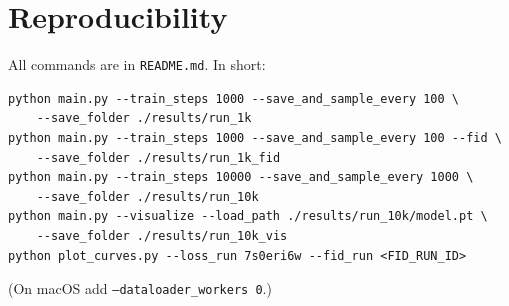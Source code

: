 \documentclass[11pt,a4paper]{article}
\begin{document}
\section*{Reproducibility}

All commands are in \texttt{README.md}. In short:
{\footnotesize
\begin{verbatim}
python main.py --train_steps 1000 --save_and_sample_every 100 \
    --save_folder ./results/run_1k
python main.py --train_steps 1000 --save_and_sample_every 100 --fid \
    --save_folder ./results/run_1k_fid
python main.py --train_steps 10000 --save_and_sample_every 1000 \
    --save_folder ./results/run_10k
python main.py --visualize --load_path ./results/run_10k/model.pt \
    --save_folder ./results/run_10k_vis
python plot_curves.py --loss_run 7s0eri6w --fid_run <FID_RUN_ID>
\end{verbatim}
}
(On macOS add \texttt{--dataloader\_workers 0}.)
\end{document}
